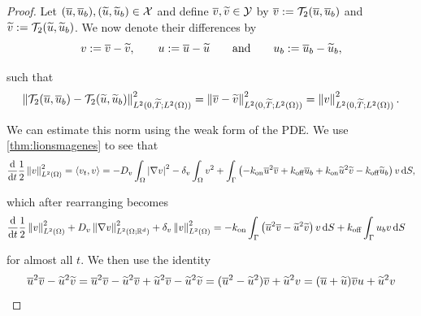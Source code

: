 \begin{proof}
    Let $(\overline{u}, \overline{u}_b), (\widetilde{u}, \widetilde{u}_b) \in \mathcal{X}$ and define $\overline{v}, \widetilde{v} \in \mathcal{Y}$ by $\overline{v} := \mathcal{T}_{2}(\overline{u}, \overline{u}_b)$ and $\widetilde{v} := \mathcal{T}_{2}(\widetilde{u}, \widetilde{u}_b)$. We now denote their differences by
%
    \begin{equation*}
        v := \overline{v} - \widetilde{v}, \qquad u := \overline{u} - \widetilde{u} \qquad \text{and} \qquad u_b := \overline{u}_b - \widetilde{u}_b,
    \end{equation*}

    \noindent
    such that
%
    \begin{equation*} 
        \left\| \mathcal{T}_{2} (\overline{u}, \overline{u}_b) - \mathcal{T}_{2} (\widetilde{u}, \widetilde{u}_b) \right\|_{L^2(0, \widetilde{T}; L^2(\Omega))}^2 = \left\| \overline{v} - \widetilde{v} \right\|_{L^2(0, \widetilde{T}; L^2(\Omega))}^2 = \left\| v \right\|_{L^2(0, \widetilde{T}; L^2(\Omega))}^2.
    \end{equation*}

    \noindent
    We can estimate this norm using the weak form of the PDE. We use \cref{thm:lionsmagenes} to see that
%
    \begin{equation*}
    \begin{aligned}
        \frac{\mathop{}\!\mathrm{d}}{\mathop{}\!\mathrm{d} t} \frac{1}{2} \left\| v \right\|_{L^2(\Omega)}^2 = \left\langle v_t, v \right\rangle = - D_v \int_\Omega \left|\nabla v\right|^2 - \delta_v \int_\Omega v^2 + \int_\Gamma \left(- k_\text{on} \overline{u}^2 \overline{v} + k_\text{off} \overline{u}_b + k_\text{on} \widetilde{u}^2 \widetilde{v} - k_\text{off} \widetilde{u}_b\right) v \mathop{}\!\mathrm{d} S ,
    \end{aligned}
    \end{equation*}

    \noindent
    which after rearranging becomes
%
    \begin{equation*}
    \begin{aligned}
        \frac{\mathop{}\!\mathrm{d}}{\mathop{}\!\mathrm{d} t} \frac{1}{2} \left\| v \right\|_{L^2(\Omega)}^2 + D_v \left\| \nabla v \right\|_{L^2(\Omega; \mathbb{R}^d)}^2 + \delta_v \left\| v \right\|_{L^2(\Omega)}^2 &= - k_\text{on} \int_\Gamma \left(\overline{u}^2 \overline{v} - \widetilde{u}^2 \widetilde{v}\right)v \mathop{}\!\mathrm{d} S + k_\text{off} \int_\Gamma u_b v \mathop{}\!\mathrm{d} S
    \end{aligned}
    \end{equation*}

    \noindent
    for almost all $t$. We then use the identity
%
    \begin{equation} \label{eq:contraction_identity_1}
        \overline{u}^2 \overline{v} - \widetilde{u}^2 \widetilde{v} = \overline{u}^2 \overline{v} - \widetilde{u}^2 \overline{v} + \widetilde{u}^2 \overline{v} - \widetilde{u}^2 \widetilde{v} = (\overline{u}^2 - \widetilde{u}^2) \overline{v} + \widetilde{u}^2 v = (\overline{u} + \widetilde{u}) \overline{v} u + \widetilde{u}^2 v
    \end{equation}


\end{proof}
